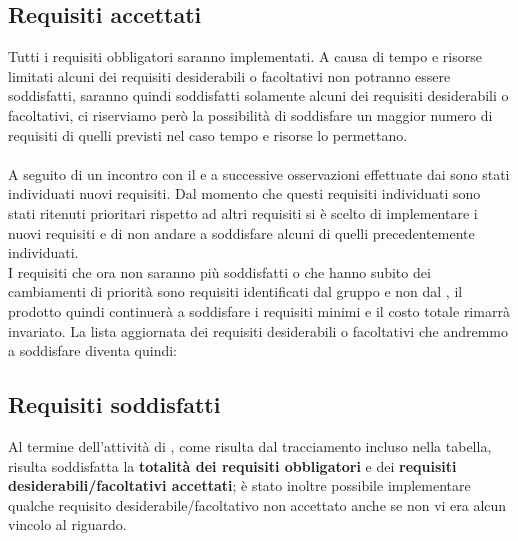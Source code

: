 \begingroup
\let\clearpage\relax



\endgroup
\clearpage
\begingroup
\let\clearpage\relax

\endgroup
\subsection{Requisiti accettati}
Tutti i requisiti obbligatori saranno implementati. A causa di tempo e risorse limitati alcuni dei requisiti desiderabili o facoltativi non potranno essere soddisfatti, saranno quindi soddisfatti solamente alcuni dei requisiti desiderabili o facoltativi, ci riserviamo però la possibilità di soddisfare un maggior numero di requisiti di quelli previsti nel caso tempo e risorse lo permettano.\\
\\
\label{reqAccettati}A seguito di un incontro con il  e a successive osservazioni effettuate dai \rPs sono stati individuati nuovi requisiti. Dal momento che questi requisiti individuati sono stati ritenuti prioritari rispetto ad altri requisiti si è scelto di implementare i nuovi requisiti e di non andare a soddisfare alcuni di quelli precedentemente individuati.\\
I requisiti che ora non saranno più soddisfatti o che hanno subito dei cambiamenti di priorità sono requisiti identificati dal gruppo e non dal , il prodotto quindi continuerà a soddisfare i requisiti minimi e il costo totale rimarrà invariato.
La lista aggiornata dei requisiti desiderabili o facoltativi che andremmo a soddisfare diventa quindi:

\subsection{Requisiti soddisfatti}
\label{soddisfatti}
Al termine dell'attività di , come risulta dal tracciamento incluso nella tabella, risulta soddisfatta la \textbf{totalità dei requisiti obbligatori} e dei \textbf{requisiti desiderabili/facoltativi accettati}; è stato inoltre possibile implementare qualche requisito desiderabile/facoltativo non accettato anche se non vi era alcun vincolo al riguardo.
